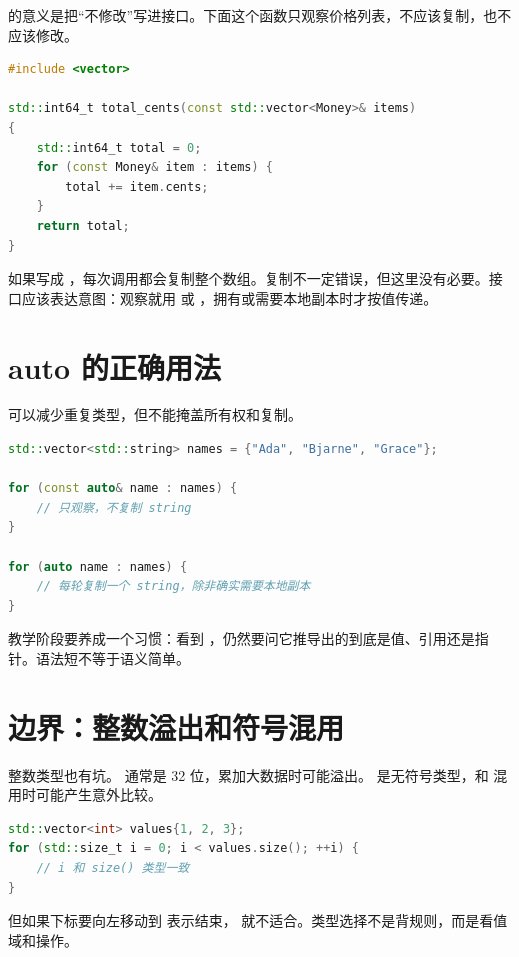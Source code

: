  的意义是把“不修改”写进接口。下面这个函数只观察价格列表，不应该复制，也不应该修改。

\begin{lstlisting}[language=C++,caption={用 const 引用表达只读访问}]
#include <vector>

std::int64_t total_cents(const std::vector<Money>& items)
{
    std::int64_t total = 0;
    for (const Money& item : items) {
        total += item.cents;
    }
    return total;
}
\end{lstlisting}

如果写成 ，每次调用都会复制整个数组。复制不一定错误，但这里没有必要。接口应该表达意图：观察就用  或 ，拥有或需要本地副本时才按值传递。

\section{auto 的正确用法}

 可以减少重复类型，但不能掩盖所有权和复制。

\begin{lstlisting}[language=C++,caption={range-for 中避免不必要复制}]
std::vector<std::string> names = {"Ada", "Bjarne", "Grace"};

for (const auto& name : names) {
    // 只观察，不复制 string
}

for (auto name : names) {
    // 每轮复制一个 string，除非确实需要本地副本
}
\end{lstlisting}

教学阶段要养成一个习惯：看到 ，仍然要问它推导出的到底是值、引用还是指针。语法短不等于语义简单。

\section{边界：整数溢出和符号混用}

整数类型也有坑。 通常是 32 位，累加大数据时可能溢出。 是无符号类型，和  混用时可能产生意外比较。

\begin{lstlisting}[language=C++,caption={避免有符号和无符号混乱}]
std::vector<int> values{1, 2, 3};
for (std::size_t i = 0; i < values.size(); ++i) {
    // i 和 size() 类型一致
}
\end{lstlisting}

但如果下标要向左移动到  表示结束， 就不适合。类型选择不是背规则，而是看值域和操作。

